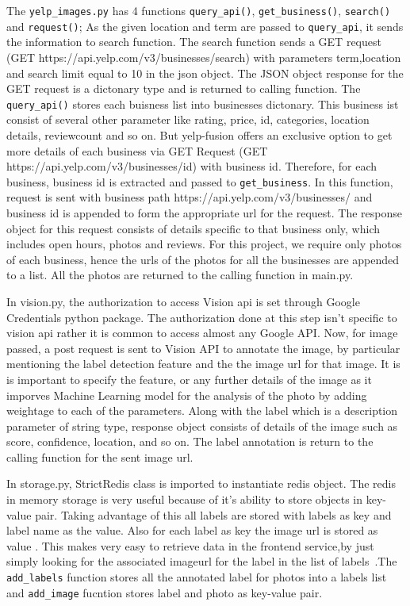 The \verb|yelp_images.py| has 4 functions \verb|query_api()|,
\verb|get_business()|, \verb|search()| and \verb|request()|; As the
given location and term are passed to \verb|query_api|, it sends the
information to search function. The search function sends a GET
request (GET https://api.yelp.com/v3/businesses/search) with
parameters term,location and search limit equal to 10 in the json
object. The JSON object response for the GET request is a dictonary
type and is returned to calling function. The \verb|query_api()|
stores each buisness list into businesses dictonary. This business ist
consist of several other parameter like rating, price, id, categories,
location details, reviewcount and so on. But yelp-fusion offers an
exclusive option to get more details of each business via GET Request
(GET https://api.yelp.com/v3/businesses/{id}) with business
id. Therefore, for each business, business id is extracted and passed
to \verb|get_business|. In this function, request is sent with
business path https://api.yelp.com/v3/businesses/ and business id is
appended to form the appropriate url for the request.  The response
object for this request consists of details specific to that business
only, which includes open hours, photos and reviews. For this project,
we require only photos of each business, hence the urls of the photos
for all the businesses are appended to a list. All the photos are
returned to the calling function in main.py.

In vision.py, the authorization to access Vision api is set through
Google Credentials python package. The authorization done at this step
isn't specific to vision api rather it is common to access almost any
Google API. Now, for image passed, a post request is sent to Vision
API to annotate the image, by particular mentioning the label
detection feature and the the image url for that image. It is is
important to specify the feature, or any further details of the image
as it imporves Machine Learning model for the analysis of the photo by
adding weightage to each of the parameters. Along with the label which
is a description parameter of string type, response object consists of
details of the image such as score, confidence, location, and so
on. The label annotation is return to the calling function for the
sent image url.

In storage.py, StrictRedis class is imported to instantiate redis
object. The redis in memory storage is very useful because of it’s
ability to store objects in key-value pair. Taking advantage of this
all labels are stored with labels as key and label name as the
value. Also for each label as key the image url is stored as value
. This makes very easy to retrieve data in the frontend service,by
just simply looking for the associated imageurl for the label in the
list of labels~\cite{hid-sp18-602-redis-implementation}.The \verb|add_labels|
function stores all the annotated label for photos into a labels list
and \verb|add_image| fucntion stores label and photo as key-value pair.


